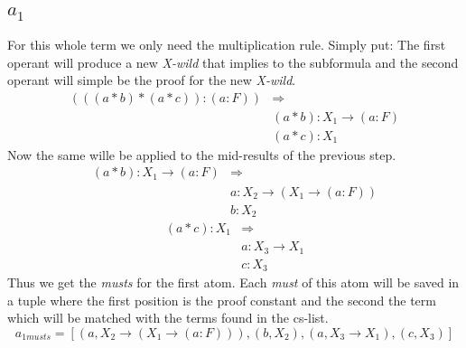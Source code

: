 \subsection[First atom]{$a_1$}
%
For this whole term we only need the multiplication rule. Simply put: The first operant will produce a new \emph{X-wild} that implies to the subformula and the second operant will simple be the proof for the new \emph{X-wild}.
\begin{equation}\label{example_atom1_must}
\begin{split}
	(((a * b)*(a * c)):(a:F)) & \Rightarrow \\
	& (a * b) : X_1 \rightarrow (a:F) \\
	& (a * c) : X_1
\end{split}
\end{equation}
Now the same wille be applied to the mid-results of the previous step.
\begin{equation}\label{example_atom1_must2}
\begin{split}
	(a * b) : X_1 \rightarrow (a:F) & \Rightarrow \\
	& a: X_2 \rightarrow (X_1 \rightarrow (a:F)) \\
	& b: X_2
\end{split}
\end{equation}
\begin{equation}\label{example_atom1_must3}
\begin{split}
	(a * c) : X_1 & \Rightarrow \\
	& a: X_3 \rightarrow X_1 \\
	& c: X_3
\end{split}
\end{equation}
Thus we get the \emph{musts} for the first atom. Each \emph{must} of this atom will be saved in a tuple where the first position is the proof constant and the second the term which will be matched with the terms found in the cs-list.
\begin{equation}
	a_{1 musts} = [(a, X_2 \rightarrow (X_1 \rightarrow (a:F))), (b, X_2), (a, X_3 \rightarrow X_1), (c, X_3)]
\end{equation}

